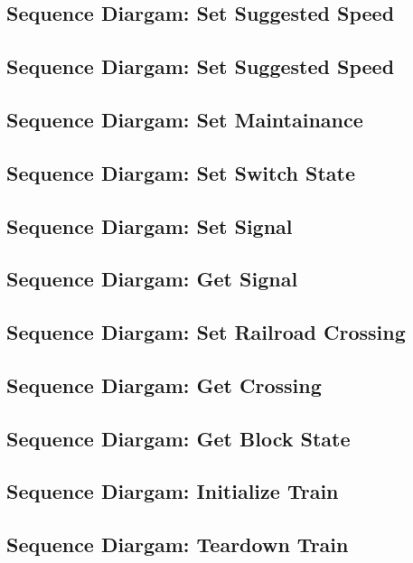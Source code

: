 \documentclass{scrreprt}
\begin{document}
\subsection{Sequence Diargam: Set Suggested Speed}

\subsection{Sequence Diargam: Set Suggested Speed}

\subsection{Sequence Diargam: Set Maintainance}

\subsection{Sequence Diargam: Set Switch State}

\subsection{Sequence Diargam: Set Signal}

\subsection{Sequence Diargam: Get Signal}

\subsection{Sequence Diargam: Set Railroad Crossing}

\subsection{Sequence Diargam: Get Crossing}

\subsection{Sequence Diargam: Get Block State}

\subsection{Sequence Diargam: Initialize Train}

\subsection{Sequence Diargam: Teardown Train}
\end{document}
